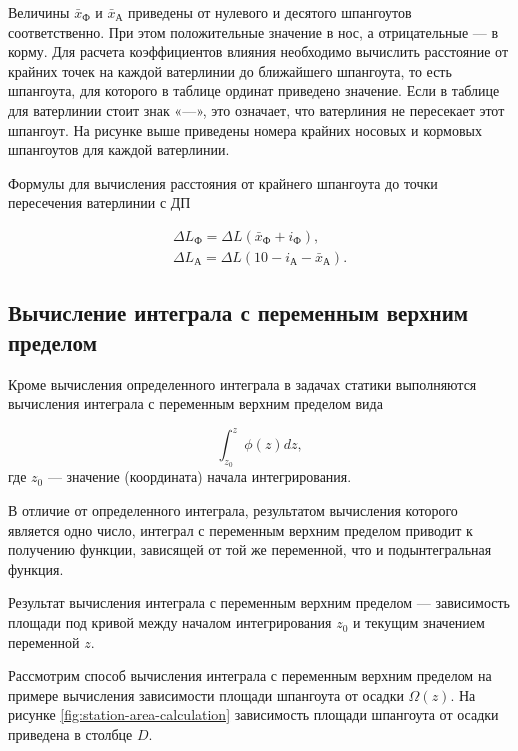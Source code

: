 Величины $\bar{x}_{\text{Ф}}$ и $\bar{x}_{\text{А}}$ приведены от нулевого и десятого шпангоутов соответственно.
При этом положительные значение в нос, а отрицательные --- в корму.
Для расчета коэффициентов влияния необходимо вычислить расстояние от крайних точек на каждой ватерлинии до ближайшего шпангоута, то есть шпангоута, для которого в таблице ординат приведено значение.
Если в таблице для ватерлинии стоит знак «---», это означает, что ватерлиния не пересекает этот шпангоут.
На рисунке выше приведены номера крайних носовых и кормовых шпангоутов для каждой ватерлинии.

Формулы для вычисления расстояния от крайнего шпангоута до точки пересечения ватерлинии с ДП

\begin{equation}
    \begin{split}
    \Delta L_{\text{Ф}} = \Delta L (\bar{x}_{\text{Ф}} + i_{\text{Ф}}),\\
     \Delta L_{\text{А}} = \Delta L (10 - i_{\text{А}} - \bar{x}_{\text{А}}).
    \end{split}
\end{equation}

\subsection{Вычисление интеграла с переменным верхним пределом}

Кроме вычисления определенного интеграла в задачах статики выполняются вычисления интеграла с переменным верхним пределом вида

\begin{equation}
    \int_{z_0}^z \phi (z) dz,
\end{equation}
где $z_0$ --- значение (координата) начала интегрирования.

В отличие от определенного интеграла, результатом вычисления которого является одно число, интеграл с переменным верхним пределом приводит к получению функции, зависящей от той же переменной, что и подынтегральная функция.

Результат вычисления интеграла с переменным верхним пределом --- зависимость площади под кривой между началом интегрирования $z_0$ и текущим значением переменной $z$.

Рассмотрим способ вычисления интеграла с переменным верхним пределом на примере вычисления зависимости площади шпангоута от осадки $\Omega(z)$.
На рисунке \ref{fig:station-area-calculation} зависимость площади шпангоута от осадки приведена в столбце $D$.


